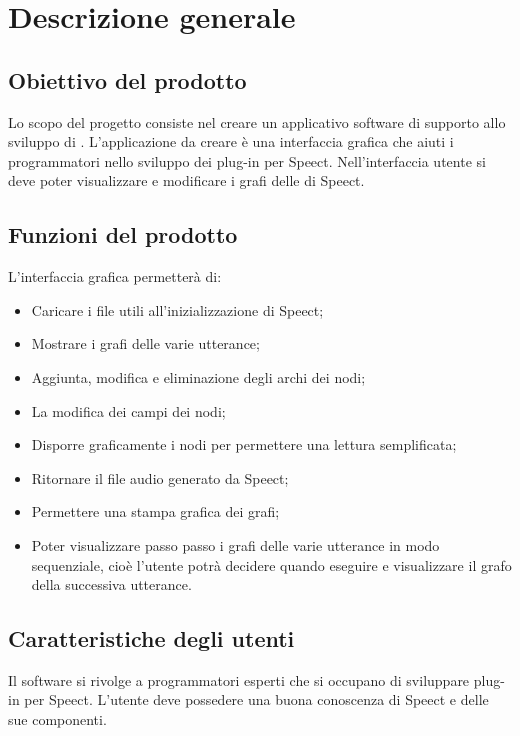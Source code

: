 \documentclass[../AnalisideiRequisiti.tex]{subfiles}
\begin{document}
	
\chapter{Descrizione generale}

\section{Obiettivo del prodotto}

Lo scopo del progetto consiste nel creare un applicativo software di supporto allo sviluppo di . L’applicazione da creare è una interfaccia grafica che aiuti i programmatori nello sviluppo dei plug-in per Speect. Nell’interfaccia utente si deve poter visualizzare e modificare i grafi delle  di Speect. 


\section{Funzioni del prodotto}
L’interfaccia grafica permetterà di:
\begin{itemize}
	\item{} Caricare i file  utili all’inizializzazione di Speect;
	\item{} Mostrare i grafi delle varie utterance;
	\item{} Aggiunta, modifica e eliminazione degli archi dei nodi;
	\item{} La modifica dei campi dei nodi;
	\item{} Disporre graficamente i nodi per permettere una lettura semplificata;
	\item{} Ritornare il file audio generato da Speect;
	\item{} Permettere una stampa grafica dei grafi;
	\item{} Poter visualizzare passo passo i grafi delle varie utterance in modo sequenziale, cioè l’utente potrà decidere quando eseguire e visualizzare il grafo della successiva utterance.	
\end{itemize}


\section{Caratteristiche degli utenti}
Il software si rivolge a programmatori esperti che si occupano di sviluppare plug-in per Speect. L'utente deve possedere una buona conoscenza di Speect e delle sue componenti.
\end{document}

